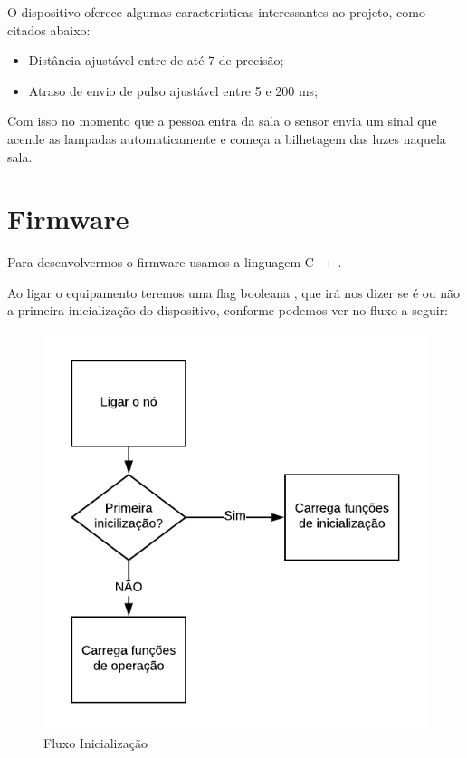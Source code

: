 \documentclass[openright]{normas-utf-tex} %
\begin{document}
O dispositivo oferece algumas caracteristicas interessantes ao projeto, como citados abaixo:

\begin{itemize}
    \item Distância ajustável entre de até 7 de precisão;
    \item Atraso de envio de pulso ajustável entre 5 e 200 ms;
\end{itemize}

Com isso no momento que a pessoa entra da sala o sensor envia um sinal que acende as lampadas automaticamente e começa a bilhetagem das luzes naquela sala.


\section{Firmware}

Para desenvolvermos o firmware usamos a linguagem C++ \cite{Altabooks}. 

Ao ligar o equipamento teremos uma flag booleana \cite{Elsevier}, que irá nos dizer se é ou não a primeira inicialização do dispositivo, conforme podemos ver no fluxo a seguir:

\begin{figure}[!htb]
     \centering
     \includegraphics[scale=1]{Primeira_Inicializacao.png}
     \caption{Fluxo Inicialização}
     \label{}
\end{figure}
\end{document}
